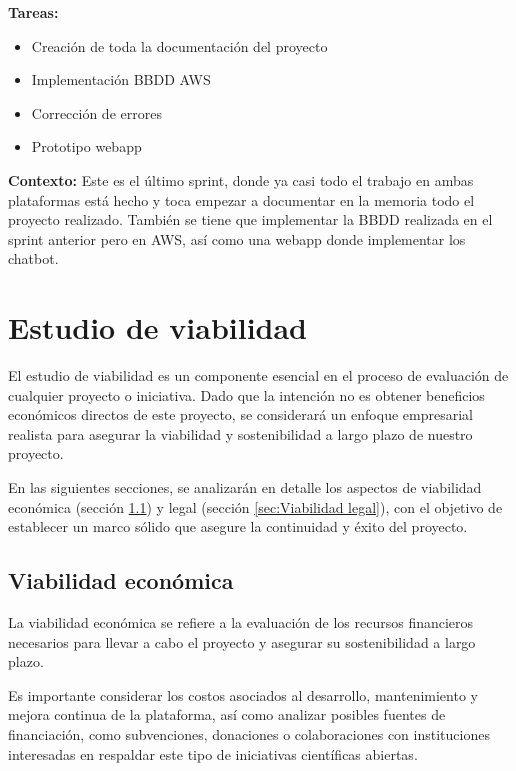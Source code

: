 \textbf{Tareas:}
\begin{itemize}
	\item Creación de toda la documentación del proyecto

	\item Implementación BBDD AWS

	\item Corrección de errores

	\item Prototipo webapp
\end{itemize}

\textbf{Contexto:} Este es el último sprint, donde ya casi todo el trabajo en
ambas plataformas está hecho y toca empezar a documentar en la memoria todo el
proyecto realizado. También se tiene que implementar la BBDD realizada en el sprint
anterior pero en AWS, así como una webapp donde implementar los chatbot.

\section{Estudio de viabilidad}

El estudio de viabilidad es un componente esencial en el proceso de evaluación de
cualquier proyecto o iniciativa. Dado que la intención no es obtener beneficios
económicos directos de este proyecto, se considerará un enfoque empresarial realista
para asegurar la viabilidad y sostenibilidad a largo plazo de nuestro proyecto.

En las siguientes secciones, se analizarán en detalle los aspectos de viabilidad
económica (sección \ref{sec:Viabilidad económica}) y legal (sección \ref{sec:Viabilidad legal}), con el objetivo de establecer un marco sólido que asegure la continuidad
y éxito del proyecto.

\subsection{Viabilidad económica}\label{sec:Viabilidad económica}
La viabilidad económica se refiere a la evaluación de los recursos financieros necesarios
para llevar a cabo el proyecto y asegurar su sostenibilidad a largo plazo.

Es importante considerar los costos asociados al desarrollo, mantenimiento y
mejora continua de la plataforma, así como analizar posibles fuentes de financiación,
como subvenciones, donaciones o colaboraciones con instituciones interesadas en
respaldar este tipo de iniciativas científicas abiertas.

